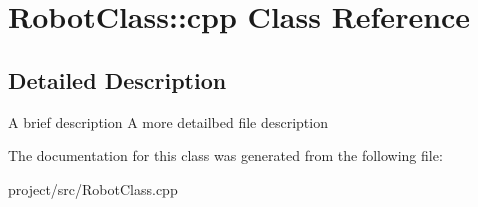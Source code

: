 \hypertarget{classRobotClass_1_1cpp}{\section{Robot\-Class\-:\-:cpp Class Reference}
\label{classRobotClass_1_1cpp}
}


\subsection{Detailed Description}
A brief description A more detailbed file description 

The documentation for this class was generated from the following file\-:\begin{DoxyCompactItemize}
\item 
project/src/Robot\-Class.\-cpp\end{DoxyCompactItemize}
